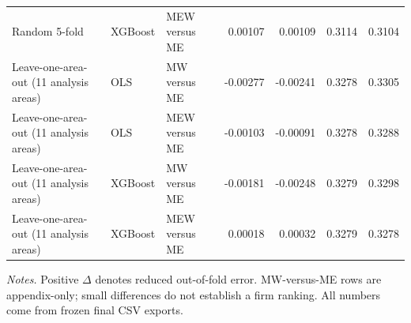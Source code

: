 \begin{landscape}
\begin{longtable}{>{\raggedright\arraybackslash}p{4cm}>{\raggedright\arraybackslash}p{2.6cm}>{\raggedright\arraybackslash}p{3.8cm}rrrr}
Random 5-fold & XGBoost & MEW versus ME & 0.00107 & 0.00109 & 0.3114 & 0.3104 \\
Leave-one-area-out (11 analysis areas) & OLS & MW versus ME & -0.00277 & -0.00241 & 0.3278 & 0.3305 \\
Leave-one-area-out (11 analysis areas) & OLS & MEW versus ME & -0.00103 & -0.00091 & 0.3278 & 0.3288 \\
Leave-one-area-out (11 analysis areas) & XGBoost & MW versus ME & -0.00181 & -0.00248 & 0.3279 & 0.3298 \\
Leave-one-area-out (11 analysis areas) & XGBoost & MEW versus ME & 0.00018 & 0.00032 & 0.3279 & 0.3278 \\
\bottomrule
\end{longtable}
{\footnotesize\noindent\emph{Notes.} Positive $\Delta$ denotes reduced out-of-fold error. MW-versus-ME rows are appendix-only; small differences do not establish a firm ranking. All numbers come from frozen final CSV exports.\par}
\end{landscape}
